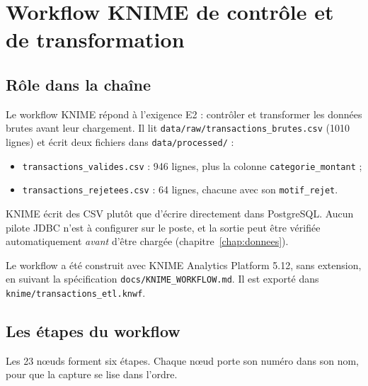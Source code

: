 \chapter{Workflow KNIME de contrôle et de transformation}\label{chap:knime}

\section{Rôle dans la chaîne}
Le workflow KNIME répond à l'exigence E2 : contrôler et transformer les données brutes avant leur
chargement. Il lit \texttt{data/raw/transactions\_brutes.csv} (1010 lignes) et écrit deux fichiers
dans \texttt{data/processed/} :
\begin{itemize}
  \item \texttt{transactions\_valides.csv} : 946 lignes, plus la colonne \texttt{categorie\_montant} ;
  \item \texttt{transactions\_rejetees.csv} : 64 lignes, chacune avec son \texttt{motif\_rejet}.
\end{itemize}
KNIME écrit des CSV plutôt que d'écrire directement dans PostgreSQL. Aucun pilote JDBC n'est à
configurer sur le poste, et la sortie peut être vérifiée automatiquement \emph{avant} d'être chargée
(chapitre~\ref{chap:donnees}).

Le workflow a été construit avec KNIME Analytics Platform 5.12, sans extension, en suivant la
spécification \texttt{docs/KNIME\_WORKFLOW.md}. Il est exporté dans \texttt{knime/transactions\_etl.knwf}.


\section{Les étapes du workflow}
Les 23 nœuds forment six étapes. Chaque nœud porte son numéro dans son nom, pour que la capture se
lise dans l'ordre.

